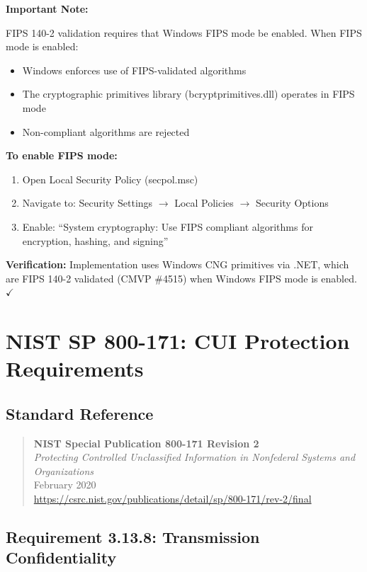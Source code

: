 \documentclass[11pt,letterpaper]{article}
\begin{document}
\textbf{Important Note:}

FIPS 140-2 validation requires that Windows FIPS mode be enabled. When FIPS mode is enabled:
\begin{itemize}
    \item Windows enforces use of FIPS-validated algorithms
    \item The cryptographic primitives library (bcryptprimitives.dll) operates in FIPS mode
    \item Non-compliant algorithms are rejected
\end{itemize}

\textbf{To enable FIPS mode:}
\begin{enumerate}
    \item Open Local Security Policy (secpol.msc)
    \item Navigate to: Security Settings $\rightarrow$ Local Policies $\rightarrow$ Security Options
    \item Enable: ``System cryptography: Use FIPS compliant algorithms for encryption, hashing, and signing''
\end{enumerate}

\textbf{Verification:} Implementation uses Windows CNG primitives via .NET, which are FIPS 140-2 validated (CMVP \#4515) when Windows FIPS mode is enabled. $\checkmark$

\newpage
\section{NIST SP 800-171: CUI Protection Requirements}

\subsection{Standard Reference}

\begin{quote}
\textbf{NIST Special Publication 800-171 Revision 2} \\
\textit{Protecting Controlled Unclassified Information in Nonfederal Systems and Organizations} \\
February 2020 \\
\url{https://csrc.nist.gov/publications/detail/sp/800-171/rev-2/final}
\end{quote}

\subsection{Requirement 3.13.8: Transmission Confidentiality}
\end{document}
